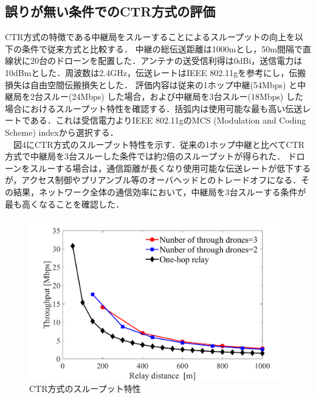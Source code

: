 \documentclass[a4paper,10pt]{ltjsarticle}
\begin{document}
\subsection{誤りが無い条件でのCTR方式の評価}
CTR方式の特徴である中継局をスルーすることによるスループットの向上を以下の条件で従来方式と比較する．
中継の総伝送距離は1000mとし，50m間隔で直線状に20台のドローンを配置した．アンテナの送受信利得は0dBi，送信電力は10dBmとした．周波数は2.4GHz，伝送レートはIEEE 802.11gを参考にし，伝搬損失は自由空間伝搬損失とした．
評価内容は従来の1ホップ中継(54Mbps) と中継局を2台スルー(24Mbps) した場合，および中継局を3台スルー(18Mbps) した場合におけるスループット特性を確認する．括弧内は使用可能な最も高い伝送レートである．これは受信電力よりIEEE 802.11gのMCS (Modulation and Coding Scheme) indexから選択する．
\\　図4にCTR方式のスループット特性を示す．従来の1ホップ中継と比べてCTR方式で中継局を3台スルーした条件では約2倍のスループットが得られた．
ドローンをスルーする場合は，通信距離が長くなり使用可能な伝送レートが低下するが，アクセス制御やプリアンブル等のオーバヘッドとのトレードオフになる．その結果，ネットワーク全体の通信効率において，中継局を3台スルーする条件が最も高くなることを確認した．
\begin{figure}[H]
  \centering
  \includegraphics[width=\linewidth]{throughtput_vs_placement_50m_max_distance_3.pdf} 
  \caption{CTR方式のスループット特性}
  \label{fig:throughput_through} 
\end{figure}
\end{document}
